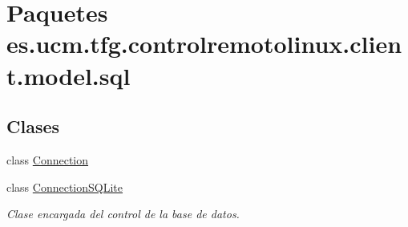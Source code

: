 \hypertarget{namespacees_1_1ucm_1_1tfg_1_1controlremotolinux_1_1client_1_1model_1_1sql}{\section{Paquetes es.\-ucm.\-tfg.\-controlremotolinux.\-client.\-model.\-sql}
\label{namespacees_1_1ucm_1_1tfg_1_1controlremotolinux_1_1client_1_1model_1_1sql}
}
\subsection*{Clases}
\begin{DoxyCompactItemize}
\item 
class \hyperlink{classes_1_1ucm_1_1tfg_1_1controlremotolinux_1_1client_1_1model_1_1sql_1_1Connection}{Connection}
\item 
class \hyperlink{classes_1_1ucm_1_1tfg_1_1controlremotolinux_1_1client_1_1model_1_1sql_1_1ConnectionSQLite}{Connection\-S\-Q\-Lite}
\begin{DoxyCompactList}\small\item\em Clase encargada del control de la base de datos. \end{DoxyCompactList}\end{DoxyCompactItemize}
